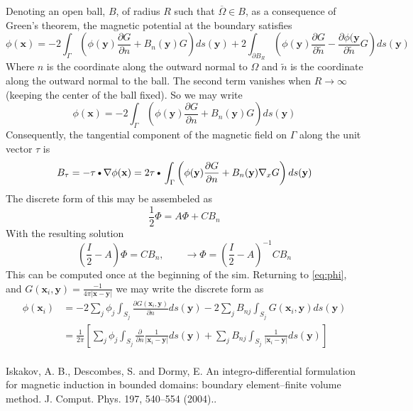 \documentclass[11pt]{article}
\newcommand{\myBullet}{\text{\textbullet}}
\begin{document}
Denoting an open ball, $B$, of radius $R$ such that $\overline{\Omega}\in B$, as a consequence of Green's theorem, the magnetic potential at the boundary satisfies
\begin{equation}
  \phi(\mathbf{x}) = 
  -2 \int_{\Gamma} \left( \phi(\mathbf{y})
  \frac{\partial G}{\partial n} + B_n(\mathbf{y}) G \right) ds(\mathbf{y})
  +2 \int_{\partial B_R} \left( \phi(\mathbf{y})
  \frac{\partial G}{\partial \tilde{n}} - \frac{\partial \phi(\mathbf{y}}{\partial \tilde{n}} G \right) ds(\mathbf{y})
\end{equation}
Where $n$ is the coordinate along the outward normal to $\Omega$ and $\tilde{n}$ is the coordinate along the outward normal to the ball. The second term vanishes when $R\rightarrow \infty$ (keeping the center of the ball fixed). So we may write
\begin{equation} \label{eq:phi}
  \phi(\mathbf{x}) = 
  -2 \int_{\Gamma} \left( \phi(\mathbf{y})
  \frac{\partial G}{\partial n} + B_n(\mathbf{y}) G \right) ds(\mathbf{y})
\end{equation}
Consequently, the tangential component of the magnetic field on $\Gamma$ along the unit vector $\tau$ is 
\begin{equation}
  B_{\tau} = - \mathbf{\tau} \myBullet \nabla \phi(\mathbf{x}) = 
  2 \mathbf{\tau} \myBullet
  \int_{\Gamma}
  \left(
  \phi(\mathbf{y}) \frac{\partial G}{\partial n}
  + B_n(\mathbf{y}) \nabla_x G
  \right) ds(\mathbf{y})
\end{equation}
The discrete form of this may be assembeled as 
\begin{equation}
  \frac{1}{2} \Phi = A \Phi + C B_n
\end{equation}
With the resulting solution
\begin{equation}
  \left(\frac{I}{2} - A\right)\Phi = C B_n, \qquad
  \rightarrow
  \Phi = \left(\frac{I}{2} - A\right)^{-1} C B_n
\end{equation}
This can be computed once at the beginning of the sim. Returning to \ref{eq:phi}, and $G(\mathbf{x}_i,\mathbf{y}) = \frac{-1}{4\pi |\mathbf{x} - \mathbf{y}|}$ we may write the discrete form as
\begin{equation}
\begin{split}
\phi(\mathbf{x}_i) & = -2 \sum_j \phi_j \int_{S_j} \frac{\partial G(\mathbf{x}_i,\mathbf{y})}{\partial n} ds(\mathbf{y})
           -2 \sum_j B_{nj} \int_{S_j} G(\mathbf{x}_i,\mathbf{y}) ds(\mathbf{y}) \\
       & = \frac{1}{2 \pi} 
       \left[
       \sum_j \phi_j \int_{S_j} \frac{\partial}{\partial n} \frac{1}{|\mathbf{x}_i-\mathbf{y}|} ds(\mathbf{y})
     + \sum_j B_{nj} \int_{S_j} \frac{1}{|\mathbf{x}_i-\mathbf{y}|} ds(\mathbf{y})
       \right] \\
\end{split}
\end{equation}


\begin{thebibliography}{1}
 Iskakov, A. B., Descombes, S. and Dormy, E. An integro-differential formulation for magnetic induction in bounded domains: boundary element–finite volume method. J. Comput. Phys. 197, 540–554 (2004)..
\end{thebibliography}
\end{document}
